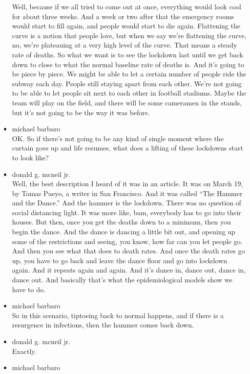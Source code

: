 \begin{itemize}
  Well, because if we all tried to come out at once, everything would
  look cool for about three weeks. And a week or two after that the
  emergency rooms would start to fill again, and people would start to
  die again. Flattening the curve is a notion that people love, but when
  we say we're flattening the curve, no, we're plateauing at a very high
  level of the curve. That means a steady rate of deaths. So what we
  want is to see the lockdown last until we get back down to close to
  what the normal baseline rate of deaths is. And it's going to be piece
  by piece. We might be able to let a certain number of people ride the
  subway each day. People still staying apart from each other. We're not
  going to be able to let people sit next to each other in football
  stadiums. Maybe the team will play on the field, and there will be
  some cameramen in the stands, but it's not going to be the way it was
  before.
\item
  michael barbaro\\
  OK. So if there's not going to be any kind of single moment where the
  curtain goes up and life resumes, what does a lifting of these
  lockdowns start to look like?
\item
  donald g. mcneil jr.\\
  Well, the best description I heard of it was in an article. It was on
  March 19, by Tomas Pueyo, a writer in San Francisco. And it was called
  ``The Hammer and the Dance.'' And the hammer is the lockdown. There
  was no question of social distancing light. It was more like, bam,
  everybody has to go into their houses. But then, once you get the
  deaths down to a minimum, then you begin the dance. And the dance is
  dancing a little bit out, and opening up some of the restrictions and
  seeing, you know, how far can you let people go. And then you see what
  that does to death rates. And once the death rates go up, you have to
  go back and leave the dance floor and go into lockdown again. And it
  repeats again and again. And it's dance in, dance out, dance in, dance
  out. And basically that's what the epidemiological models show we have
  to do.
\item
  michael barbaro\\
  So in this scenario, tiptoeing back to normal happens, and if there is
  a resurgence in infections, then the hammer comes back down.
\item
  donald g. mcneil jr.\\
  Exactly.
\item
  michael barbaro\\

\end{itemize}
